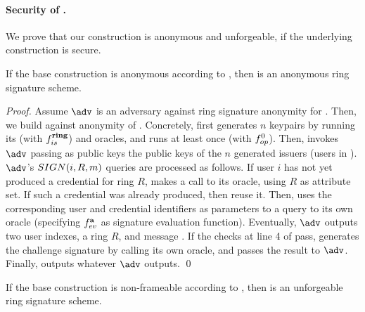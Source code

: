 
\paragraph{Security of \CUASRing.} %
We prove that our \CUASRing construction is anonymous and unforgeable, if
the underlying \CUASGen construction is secure.

\begin{theorem}
  If the base \CUASGen construction is anonymous according to
  , then \CUASRing is an anonymous ring signature
  scheme.
\end{theorem}

\begin{proof}
  Assume $\adv$ is an adversary against ring signature anonymity for \CUASRing.
  Then, we build \advB against anonymity of \CUASGen. Concretely, \advB first
  generates $n$ keypairs by running its \IGEN (with $f_{is}^{\mathbf{ring}}$) and
  \HUGEN oracles, and runs \OGEN at least once (with $f_{op}^0$). Then, invokes
  $\adv$ passing as public keys the public keys of the $n$ generated issuers
  (users in \CUASRing). $\adv$'s $SIGN(i,R,m)$ queries are processed as
  follows. If user $i$ has not yet produced a credential for ring $R$, \advB
  makes a call to its \OBTAIN oracle, using $R$ as attribute set. If such a
  credential was already produced, then reuse it. Then, \advB uses the
  corresponding user and credential identifiers as parameters to a query to its
  own \SIGN oracle (specifying $f_{ev}^{\mathbf{a}}$ as signature evaluation
  function). Eventually, $\adv$ outputs two user indexes, a ring $R$, and
  message \msg. If the checks at line 4 of  pass, \advB
  generates the challenge signature by calling its own \CHALb oracle, and passes
  the result to $\adv$. Finally, \advB outputs whatever $\adv$ outputs.
  \qed
\end{proof}

\begin{theorem}
  If the base \CUASGen construction is non-frameable according to
  , then \CUASRing is an unforgeable ring signature
  scheme.
\end{theorem}


